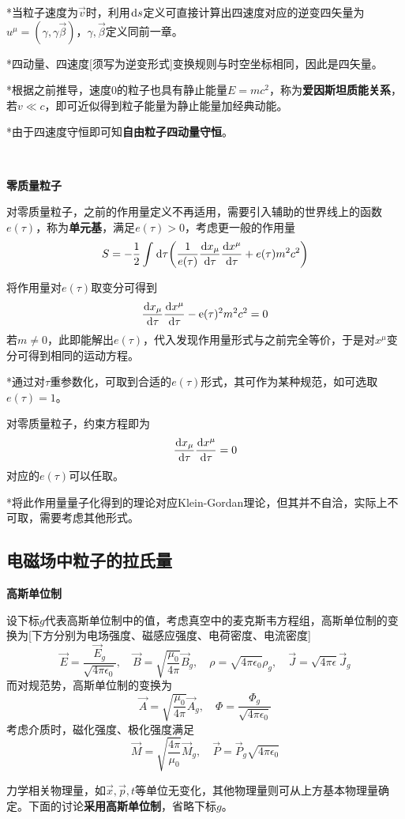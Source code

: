 \documentclass[a4paper,UTF8,fontset=windows]{ctexart}
\newcommand*{\dr}{\hspace{0.07em}\mathrm{d}}
\newcommand*{\er}{\mathrm{e}}
\newcommand*{\va}{\vec{A}}
\newcommand*{\vb}{\vec{B}}
\newcommand*{\ve}{\vec{E}}
\newcommand*{\vj}{\vec{J}}
\newcommand*{\vm}{\vec{M}}
\newcommand*{\vp}{\vec{P}}
\newcommand*{\vps}{\vec{p}}
\newcommand*{\vvs}{\vec{v}}
\newcommand*{\vx}{\vec{x}}
\newcommand*{\vbeta}{\vec{\beta}}
\newcommand*{\dt}[2][t]{\frac{\dr #2}{\dr #1}}
\begin{document}
*当粒子速度为$\vvs$时，利用$\dr s$定义可直接计算出四速度对应的逆变四矢量为$u^\mu=(\gamma,\gamma\vbeta)$，$\gamma,\vbeta$定义同前一章。

*四动量、四速度[须写为逆变形式]变换规则与时空坐标相同，因此是四矢量。

*根据之前推导，速度0的粒子也具有静止能量$E=mc^2$，称为\textbf{爱因斯坦质能关系}，若$v\ll c$，即可近似得到粒子能量为静止能量加经典动能。

*由于四速度守恒即可知\textbf{自由粒子四动量守恒}。

\

\textbf{零质量粒子}

对零质量粒子，之前的作用量定义不再适用，需要引入辅助的世界线上的函数$e(\tau)$，称为\textbf{单元基}，满足$e(\tau)>0$，考虑更一般的作用量
$$S=-\frac{1}{2}\int\dr\tau\bigg(\frac{1}{e(\tau)}\dt[\tau]{x_\mu}\dt[\tau]{x^\mu}+e(\tau)m^2c^2\bigg)$$

将作用量对$e(\tau)$取变分可得到
$$\dt[\tau]{x_\mu}\dt[\tau]{x^\mu}-\er(\tau)^2m^2c^2=0$$
若$m\ne 0$，此即能解出$e(\tau)$，代入发现作用量形式与之前完全等价，于是对$x^\mu$变分可得到相同的运动方程。

*通过对$\tau$重参数化，可取到合适的$e(\tau)$形式，其可作为某种规范，如可选取$e(\tau)=1$。

对零质量粒子，约束方程即为
$$\dt[\tau]{x_\mu}\dt[\tau]{x^\mu}=0$$
对应的$e(\tau)$可以任取。

*将此作用量量子化得到的理论对应Klein-Gordan理论，但其并不自洽，实际上不可取，需要考虑其他形式。

\subsection{电磁场中粒子的拉氏量}
\textbf{高斯单位制}

设下标$g$代表高斯单位制中的值，考虑真空中的麦克斯韦方程组，高斯单位制的变换为[下方分别为电场强度、磁感应强度、电荷密度、电流密度]
$$\ve=\frac{\ve_g}{\sqrt{4\pi\epsilon_0}},\quad\vb=\sqrt{\frac{\mu_0}{4\pi}}\vb_g,\quad\rho=\sqrt{4\pi\epsilon_0}\rho_g,\quad\vj=\sqrt{4\pi\epsilon}\vj_g$$
而对规范势，高斯单位制的变换为
$$\va=\sqrt{\frac{\mu_0}{4\pi}}\va_g,\quad\Phi=\frac{\Phi_g}{\sqrt{4\pi\epsilon_0}}$$
考虑介质时，磁化强度、极化强度满足
$$\vm=\sqrt{\frac{4\pi}{\mu_0}}\vm_g,\quad\vp=\vp_g\sqrt{4\pi\epsilon_0}$$

力学相关物理量，如$\vx,\vps,t$等单位无变化，其他物理量则可从上方基本物理量确定。下面的讨论\textbf{采用高斯单位制}，省略下标$g$。

\
\end{document}
